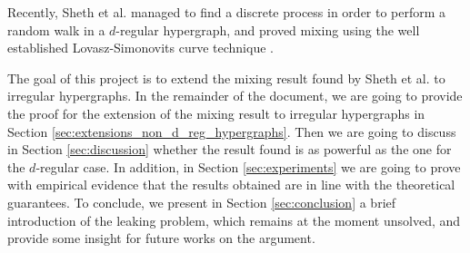 \documentclass[../main.tex]{subfiles}
\begin{document}
    Recently, Sheth et al. managed to find a discrete process in order to perform a random walk in a $d$-regular hypergraph, and proved mixing using the well established Lovasz-Simonovits curve technique \cite{Lovsz1993RandomWI}. 
    
    The goal of this project is to extend the mixing result found by Sheth et al. to irregular hypergraphs. In the remainder of the document, we are going to provide the proof for the extension of the mixing result to irregular hypergraphs in Section \ref{sec:extensions_non_d_reg_hypergraphs}. Then we are going to discuss in Section \ref{sec:discussion} whether the result found is as powerful as the one for the $d$-regular case. In addition, in Section \ref{sec:experiments} we are going to prove with empirical evidence that the results obtained are in line with the theoretical guarantees. To conclude, we present in Section \ref{sec:conclusion} a brief introduction of the leaking problem, which remains at the moment unsolved, and provide some insight for future works on the argument.
    
    
\end{document}
